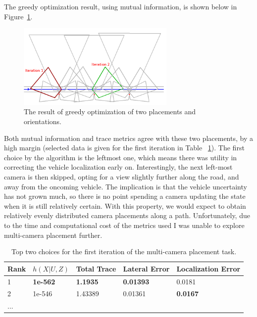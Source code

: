 \documentclass[a4paper,12pt,twoside,openright]{report}
\begin{document}
The greedy optimization result, using mutual information, is shown below in Figure~\ref{fig:complexobjective:straightresult}.

\begin{figure}[htb]
    \centering
    \includegraphics[width=3in]{figures/multi_placement/straightroad_80m_result.png}
    \caption[Multi-camera Placement Choices Result]{The result of greedy optimization of two placements and orientations.}
    \label{fig:complexobjective:straightresult}
\end{figure}

Both mutual information and trace metrics agree with these two placements, by a high margin (selected data is given 
for the first iteration in Table ~\ref{tab:straightroad multiplacement}). The first choice by the algorithm is the leftmost one, which means
there was utility in correcting the vehicle localization early on. Interestingly,
the next left-most camera is then skipped, opting for a view slightly further 
along the road, and away from the oncoming vehicle. The implication is that
the vehicle uncertainty has not grown much, so there is no point
spending a camera updating the state when it is still relatively certain.
With this property, we would expect to obtain
relatively evenly distributed camera placements along a path. Unfortunately,
due to the time and computational cost of the metrics used I was unable to
explore multi-camera placement further.

\begin{table}[htb]
    \centering
    \caption[Multi-camera Placement Data, Iteration 1]{Top two choices for the first iteration of the multi-camera placement task.}
    \label{tab:straightroad multiplacement}
    \begin{tabular}{@{}lllll@{}}
        \toprule
        Rank & $h(X|U, Z)$ & Total Trace & Lateral Error & Localization Error \\ \midrule
        1    & \textbf{1e-562}    & \textbf{1.1935}        & \textbf{0.01393}        & 0.0181              \\
        2    & 1e-546    & 1.43389        & 0.01361        & \textbf{0.0167} \\
        ...
    \end{tabular}
\end{table}
\end{document}

